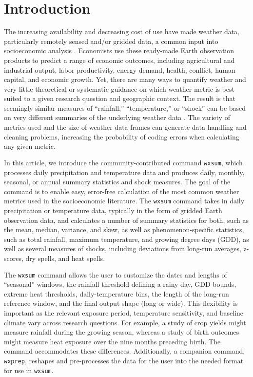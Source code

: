 \section{Introduction}

The increasing availability and decreasing cost of use have made weather data, particularly remotely sensed and/or gridded data, a common input into socioeconomic analysis \citep{GortanEtAl24, WuepperEtAl25}. Economists use these ready-made Earth observation products to predict a range of economic outcomes, including agricultural and industrial output, labor productivity, energy demand, health, conflict, human capital, and economic growth. Yet, there are many ways to quantify weather and very little theoretical or systematic guidance on which weather metric is best suited to a given research question and geographic context. The result is that seemingly similar measures of ``rainfall,'' ``temperature,'' or ``shock'' can be based on very different summaries of the underlying weather data \citep{MichlerEtAl26Mining}. The variety of metrics used and the size of weather data frames can generate data-handling and cleaning problems, increasing the probability of coding errors when calculating any given metric.

In this article, we introduce the community-contributed command \texttt{wxsum}, which processes daily precipitation and temperature data and produces daily, monthly, seasonal, or annual summary statistics and shock measures. The goal of the command is to enable easy, error-free calculation of the most common weather metrics used in the socioeconomic literature. The \texttt{wxsum} command takes in daily precipitation or temperature data, typically in the form of gridded Earth observation data, and calculates a number of summary statistics for both, such as the mean, median, variance, and skew, as well as phenomenon-specific statistics, such as total rainfall, maximum temperature, and growing degree days (GDD), as well as several measures of shocks, including deviations from long-run averages, z-scores, dry spells, and heat spells. 

The \texttt{wxsum} command allows the user to customize the dates and lengths of ``seasonal'' windows, the rainfall threshold defining a rainy day, GDD bounds, extreme heat thresholds, daily-temperature bins, the length of the long-run reference window, and the final output shape (long or wide). This flexibility is important as the relevant exposure period, temperature sensitivity, and baseline climate vary across research questions. For example, a study of crop yields might measure rainfall during the growing season, whereas a study of birth outcomes might measure heat exposure over the nine months preceding birth. The command accommodates these differences. Additionally, a companion command, \texttt{wxprep}, reshapes and pre-processes the data for the user into the needed format for use in \texttt{wxsum}.

